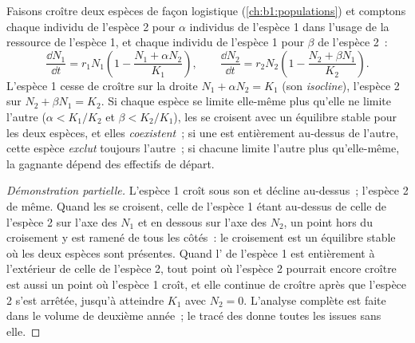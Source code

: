 \begin{proposition}\label{prop:b1:species-interactions:lotka}
Faisons croître deux espèces de façon logistique
(\cref{ch:b1:populations}) et comptons chaque individu de l'espèce 2
pour $\alpha$ individus de l'espèce 1 dans l'usage de la ressource de
l'espèce 1, et chaque individu de l'espèce 1 pour $\beta$ de l'espèce 2~:
\[
\frac{\dd N_1}{\dd t} = r_1 N_1\left(1 - \frac{N_1 + \alpha N_2}{K_1}\right),
\qquad
\frac{\dd N_2}{\dd t} = r_2 N_2\left(1 - \frac{N_2 + \beta N_1}{K_2}\right).
\]
L'espèce 1 cesse de croître sur la droite $N_1 + \alpha N_2 = K_1$ (son
\emph{isocline}), l'espèce 2 sur $N_2 + \beta N_1 = K_2$.
Si chaque espèce se limite elle-même plus qu'elle ne limite l'autre ($\alpha <
K_1/K_2$ et $\beta < K_2/K_1$), les  se croisent avec un
équilibre stable pour les deux espèces, et elles \emph{coexistent}~; si
une  est entièrement au-dessus de l'autre, cette espèce
\emph{exclut} toujours l'autre~; si chacune limite l'autre plus
qu'elle-même, la gagnante dépend des effectifs de départ.
\end{proposition}
\begin{proof}[Démonstration partielle]
L'espèce 1 croît sous son  et décline au-dessus~; l'espèce 2 de
même. Quand les  se croisent, celle de l'espèce 1 étant
au-dessus de celle de l'espèce 2 sur l'axe des $N_1$ et en dessous sur
l'axe des $N_2$, un point hors du croisement y est ramené de tous les
côtés~: le croisement est un équilibre stable où les deux espèces sont
présentes. Quand l' de l'espèce 1 est entièrement à l'extérieur
de celle de l'espèce 2, tout point où l'espèce 2 pourrait encore croître
est aussi un point où l'espèce 1 croît, et elle continue de croître
après que l'espèce 2 s'est arrêtée, jusqu'à atteindre $K_1$ avec
$N_2 = 0$. L'analyse complète est faite dans le volume de deuxième
année~; le tracé des  donne toutes les issues sans elle.
\end{proof}

